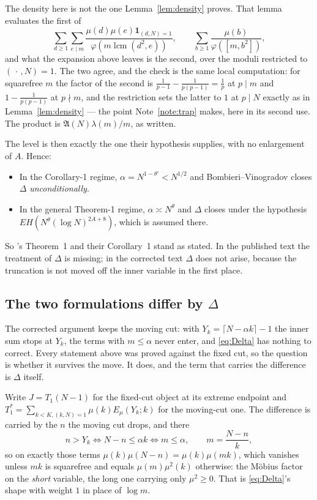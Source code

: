 \documentclass[11pt,a4paper]{article}
\theoremstyle{plain}
\theoremstyle{definition}
\theoremstyle{remark}
\newcommand{\AAA}{\mathfrak{A}}
\newcommand{\Emu}{E_\mu}
\DeclareMathOperator{\lcm}{lcm}
\begin{document}
The density here is not the one Lemma~\ref{lem:density} proves. That
lemma evaluates the first of
\[
  \sum_{d\ge1}\sum_{e\mid m}
    \frac{\mu(d)\mu(e)\mathbf 1_{(d,N)=1}}{\varphi(m\lcm(d^2,e))},
  \qquad
  \sum_{b\ge1}\frac{\mu(b)}{\varphi([m,b^2])},
\]
and what the expansion above leaves is the second, over the moduli
restricted to $(\,\cdot\,,N)=1$. The two agree, and the check is the same local
computation: for squarefree $m$ the factor of the second is
$\tfrac{1}{p-1}-\tfrac{1}{p(p-1)}=\tfrac1p$ at $p\mid m$ and
$1-\tfrac{1}{p(p-1)}$ at $p\nmid m$, and the restriction sets the
latter to $1$ at $p\mid N$ exactly as in Lemma~\ref{lem:density} ---
the point Note~\ref{note:trap} makes, here in its second use. The
product is $\AAA(N)\lambda(m)/m$, as written.

The level is then exactly the one their hypothesis supplies, with no
enlargement of $A$. Hence:
\begin{itemize}
\item In the Corollary-1 regime, $\alpha=N^{1-\theta'}<N^{1/2}$ and
  Bombieri--Vinogradov closes $\Delta$ \emph{unconditionally}.
\item In the general Theorem-1 regime, $\alpha\asymp N^{\theta}$ and
  $\Delta$ closes under the hypothesis
  $EH(N^{\theta}(\log N)^{2A+8})$, which is assumed there.
\end{itemize}
So \cite{HL}'s Theorem~1 and their Corollary~1 stand as stated. In the
published text the treatment of $\Delta$ is missing; in the corrected
text $\Delta$ does not arise, because the truncation is not moved off
the inner variable in the first place.

\subsection{The two formulations differ by \texorpdfstring{$\Delta$}%
{Delta}}\label{sec:movingcut}

The corrected argument keeps the moving cut: with
$Y_k=\lceil N-\alpha k\rceil-1$ the inner sum stops at $Y_k$, the terms
with $m\le\alpha$ never enter, and \eqref{eq:Delta} has nothing to
correct. Every statement above was proved against the fixed cut, so the
question is whether it survives the move. It does, and the term that
carries the difference is $\Delta$ itself.

Write $J=T_1(N-1)$ for the fixed-cut object at its extreme endpoint and
$T_1^\ast=\sum_{k<K,(k,N)=1}\mu(k)\Emu(Y_k;k)$ for the moving-cut one.
The difference is carried by the $n$ the moving cut drops, and there
\[
  n>Y_k \iff N-n\le\alpha k \iff m\le\alpha,
  \qquad m=\frac{N-n}{k},
\]
so on exactly those terms $\mu(k)\mu(N-n)=\mu(k)\mu(mk)$, which
vanishes unless $mk$ is squarefree and equals $\mu(m)\mu^2(k)$
otherwise: the M\"obius factor on the \emph{short} variable, the long
one carrying only $\mu^2\ge0$. That is \eqref{eq:Delta}'s shape with
weight $1$ in place of $\log m$.
\end{document}
